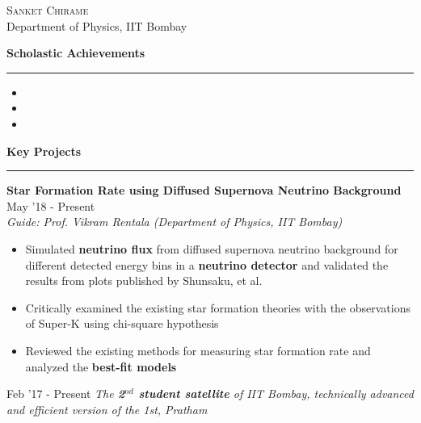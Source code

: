 \documentclass[8pt]{article}%
\begin{document}
\begin{center}
\huge{\textsc{Sanket Chirame}}\\
\vspace{1.5mm}
\normalsize{Department of Physics, IIT Bombay}\\
\end{center}
\vspace{3mm}
{\small
\begin{flushleft}
\bf{\Large{Scholastic Achievements}}
\end{flushleft}
\vspace{-1mm}
\hrule
\begin{itemize}
\setlength\itemsep{0.01em}%

\item 
\item 
\item 

\end{itemize}

\begin{flushleft}
\bf{\Large{Key Projects}}
\end{flushleft}
 \vspace{-2mm}
\hrule

{\flushleft \bf \large{Star Formation Rate using Diffused Supernova Neutrino Background}}  \hfill {{{May '18 - Present}}} \\
{\em Guide: Prof. Vikram Rentala (Department of Physics, IIT Bombay)} 

\begin{itemize}
    \setlength\itemsep{0.01em}

    \item Simulated {\bf neutrino flux} from diffused supernova neutrino background for different detected energy bins in a {\bf neutrino detector} and validated the results from plots published by Shunsaku, et al.
    \item Critically examined the existing star formation theories with the observations of Super-K using chi-square hypothesis
    \item Reviewed the existing methods for measuring star formation rate and analyzed the {\bf best-fit models}

\end{itemize}

{} \hfill {{Feb '17 - Present}} 
\vspace{-2mm}
{\flushleft \em{The {\bf \em 2$^{nd}$ student satellite} of IIT Bombay, technically advanced and efficient version of the 1st, Pratham}}\\
\vspace{-6mm}

}
\end{document}
